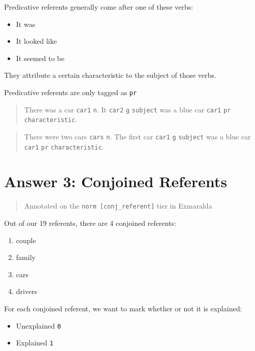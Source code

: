 \documentclass[
]{book}
\providecommand{\tightlist}{%
  \setlength{\itemsep}{0pt}\setlength{\parskip}{0pt}}
\begin{document}
Predicative referents generally come after one of these verbs:

\begin{itemize}
\tightlist
\item
  It was
\item
  It looked like
\item
  It seemed to be
\end{itemize}

They attribute a certain characteristic to the subject of those verbs.

Predicative referents are only tagged as \texttt{pr}

\begin{quote}
There was a car \texttt{car1} \texttt{n}.
It \texttt{car2} \texttt{g} \texttt{subject} was a blue car \texttt{car1} \texttt{pr} \texttt{characteristic}.
\end{quote}

\begin{quote}
There were two cars \texttt{cars} \texttt{n}.
The first car \texttt{car1} \texttt{g} \texttt{subject} was a blue car \texttt{car1} \texttt{pr} \texttt{characteristic}.
\end{quote}

\hypertarget{answer-3-conjoined-referents}{%
\chapter{Answer 3: Conjoined Referents}\label{answer-3-conjoined-referents}}

\begin{quote}
Annotated on the \texttt{norm\ {[}conj\_referent{]}} tier in Exmaralda
\end{quote}

Out of our 19 referents, there are 4 conjoined referents:

\begin{enumerate}
\def\labelenumi{\arabic{enumi}.}
\tightlist
\item
  couple
\item
  family
\item
  cars
\item
  drivers
\end{enumerate}

For each conjoined referent, we want to mark whether or not it is explained:

\begin{itemize}
\tightlist
\item
  Unexplained \texttt{0}
\item
  Explained \texttt{1}
\end{itemize}
\end{document}
